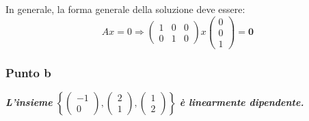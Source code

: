 \documentclass[a4paper]{article}
\begin{document}
	\noindent
	In generale, la forma generale della soluzione deve essere:
	\begin{equation*}
		A x = 0 \Longrightarrow
		\begin{pmatrix}
			1 & 0 & 0 \\ 0 & 1 & 0
		\end{pmatrix}
		x\begin{pmatrix}
			0 \\ 0 \\ 1
		\end{pmatrix} = \mathbf{0}
	\end{equation*}\newpage

	\subsubsection{Punto b}

	\textcolor{Green4}{\textbf{\emph{L'insieme }} $\left\{\begin{pmatrix}
		-1 \\ 0
	\end{pmatrix}, \begin{pmatrix}
		2 \\ 1
	\end{pmatrix}, \begin{pmatrix}
		1 \\ 2
	\end{pmatrix}\right\}$ \textbf{\emph{è linearmente dipendente.}}}\newline
\end{document}
